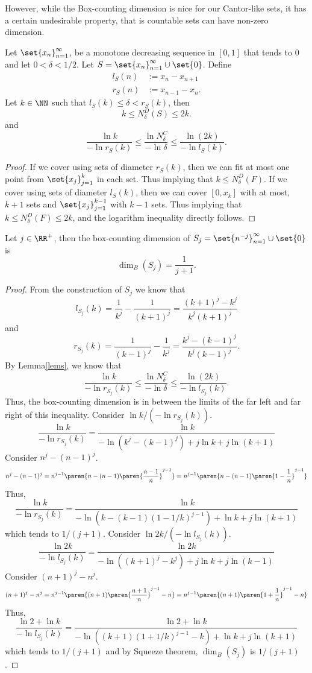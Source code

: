 However, while the Box-counting dimension is nice for our Cantor-like sets, it has a certain undesirable property, that is countable sets can have non-zero dimension.

\begin{lemma}\label{lems}
	Let $\set{x_n}_{n=1}^\infty$, be a monotone decreasing sequence in $[0,1]$ that tends to 0 and let $0 < \delta < 1/2$.
	Let $S=\set{x_n}_{n=1}^\infty\cup\set{0}$.
	Define
	\begin{align*}
		l_S(n)&:= x_n-x_{n+1}\\
		r_S(n)&:= x_{n-1}-x_n.
	\end{align*}
	Let $k\in\NN$ such that $l_S(k)\leq \delta < r_S(k)$, then
	\[
		k \leq N^D_\delta(S)\leq 2k.
	\]
	and
	\[
		\frac{\ln k}{-\ln r_S(k)}\leq \frac{\ln N^C_\delta}{-\ln\delta}\leq\frac{\ln (2k)}{-\ln l_S(k)}.
	\]
\end{lemma}
\begin{proof}
	If we cover using sets of diameter $r_S(k)$, then we can fit at most one point from $\set{x_j}_{j=1}^k$ in each set.
	Thus implying that $k\leq N^D_\delta(F)$.
	If we cover using sets of diameter $l_S(k)$, then we can cover $[0,x_k]$ with at most, $k+1$ sets and $\set{x_j}_{j=1}^{k-1}$ with $k-1$ sets.
	Thus implying that $k\leq N^D_\delta(F)\leq 2k$, and the logarithm inequality directly follows.
\end{proof}

\begin{example}
	Let $j\in\RR^+$, then the box-counting dimension of $S_j=\set{n^{-j}}_{n=1}^\infty\cup\set{0}$ is
	\[
		\dim_B(S_j)=\frac{1}{j+1}.
	\]
\end{example}
\begin{proof}
	From the construction of $S_j$ we know that
	\[
		l_{S_j}(k) = \frac{1}{k^j}-\frac{1}{(k+1)^j} = \frac{(k+1)^j-k^j}{k^j(k+1)^j}
	\]
	and
	\[
		r_{S_j}(k) = \frac{1}{(k-1)^j}-\frac{1}{k^j} = \frac{k^j-(k-1)^j}{k^j(k-1)^j}.
	\]
	By Lemma\autoref{lems}, we know that
	\[
		\frac{\ln k}{-\ln r_{S_j}(k)}\leq \frac{\ln N^C_\delta}{-\ln\delta}\leq\frac{\ln (2k)}{-\ln l_{S_j}(k)}.
	\]
	Thus, the box-counting dimension is in between the limits of the far left and far right of this inequality.
	Consider $\ln k/(-\ln r_{S_j}(k))$.
	\[
		\frac{\ln k}{-\ln r_{S_j}(k)}=\frac{\ln k}{-\ln (k^j-(k-1)^j)+j\ln k +j\ln(k+1)}
	\]
	Consider $n^j-(n-1)^j$.
	\[
		n^j-(n-1)^j=n^{j-1}\paren{ n - (n-1)\paren{\frac{n-1}{n}}^{j-1} }=n^{j-1}\paren{ n - (n-1)\paren{1-\frac{1}{n}}^{j-1} }
	\]
	Thus,
	\[
		\frac{\ln k}{-\ln r_{S_j}(k)}=\frac{\ln k}{-\ln(k-(k-1)(1-1/k)^{j-1})+\ln k +j\ln(k+1)}
	\]
	which tends to $1/(j+1)$.
	Consider $\ln 2k/(-\ln l_{S_j}(k))$.
	\[
		\frac{\ln 2k}{-\ln l_{S_j}(k)}=\frac{\ln 2k}{-\ln ((k+1)^j-k^j)+j\ln k +j\ln(k-1)}
	\]
	Consider $(n+1)^j-n^j$.
	\[
		(n+1)^j-n^j=n^{j-1}\paren{ (n+1)\paren{\frac{n+1}{n}}^{j-1} - n }=n^{j-1}\paren{ (n+1)\paren{1+\frac{1}{n}}^{j-1} - n }
	\]
	Thus,
	\[
		\frac{\ln 2 +\ln k}{-\ln l_{S_j}(k)}=\frac{\ln 2+\ln k}{-\ln((k+1)(1+1/k)^{j-1}-k)+\ln k +j\ln(k+1)}
	\]
	which tends to $1/(j+1)$ and by Squeeze theorem, $\dim_B(S_j)$ is $1/(j+1)$.
\end{proof}

